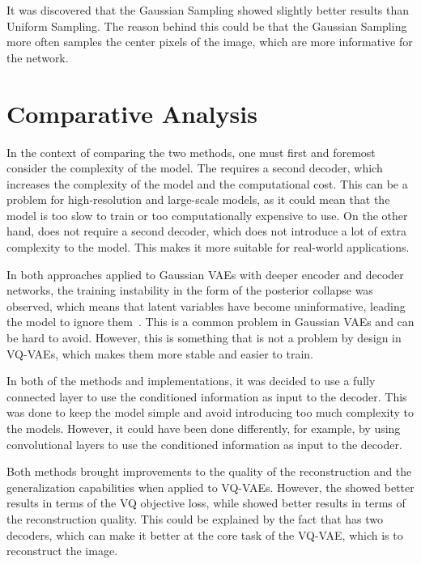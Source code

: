 It was discovered that the Gaussian Sampling showed slightly better results than Uniform Sampling. The reason behind this could be that the Gaussian Sampling more often samples the center pixels of the image, which are more informative for the network.

\section{Comparative Analysis}

In the context of comparing the two methods, one must first and foremost consider the complexity of the model. The  requires a second decoder,
which increases the complexity of the model and the computational cost. This can be a problem for high-resolution and large-scale models, as it could mean that the model is too slow to train or too computationally expensive to use. On the other hand,  does not require a second decoder, which does not introduce a lot of extra complexity to the model. This makes it more suitable for real-world applications.

In both approaches applied to Gaussian VAEs with deeper encoder and decoder networks, the training instability in the form of the posterior collapse was observed, which means that latent variables have become uninformative, leading the model to ignore them~\cite{lucas2019dont}. This is a common problem in Gaussian VAEs and can be hard to avoid. However, this is something that is not a problem by design in VQ-VAEs, which makes them more stable and easier to train.

In both of the methods and implementations, it was decided to use a fully connected layer to use the conditioned information as input to the decoder. This was done to keep the model simple and avoid introducing too much complexity to the models. However, it could have been done differently, for example, by using convolutional layers to use the conditioned information as input to the decoder.

Both methods brought improvements to the quality of the reconstruction and the generalization capabilities when applied to VQ-VAEs. However, the  showed better results in terms of the VQ objective loss, while  showed better results in terms of the reconstruction quality. This could be explained by the fact that  has two decoders, which can make it better at the core task of the VQ-VAE, which is to reconstruct the image.


